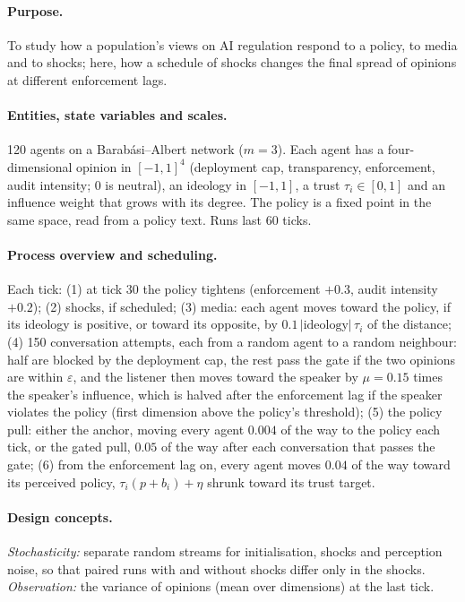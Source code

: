 \documentclass[11pt]{article}
\begin{document}
\paragraph{Purpose.} To study how a population's views on AI regulation respond to a policy, to media and to shocks; here, how a schedule of shocks changes the final spread of opinions at different enforcement lags.

\paragraph{Entities, state variables and scales.} 120 agents on a Barab\'asi--Albert network ($m=3$). Each agent has a four-dimensional opinion in $[-1,1]^4$ (deployment cap, transparency, enforcement, audit intensity; 0 is neutral), an ideology in $[-1,1]$, a trust $\tau_i \in [0,1]$ and an influence weight that grows with its degree. The policy is a fixed point in the same space, read from a policy text. Runs last 60 ticks.

\paragraph{Process overview and scheduling.} Each tick: (1) at tick 30 the policy tightens (enforcement $+0.3$, audit intensity $+0.2$); (2) shocks, if scheduled; (3) media: each agent moves toward the policy, if its ideology is positive, or toward its opposite, by $0.1\,|\text{ideology}|\,\tau_i$ of the distance; (4) 150 conversation attempts, each from a random agent to a random neighbour: half are blocked by the deployment cap, the rest pass the gate if the two opinions are within $\varepsilon$, and the listener then moves toward the speaker by $\mu = 0.15$ times the speaker's influence, which is halved after the enforcement lag if the speaker violates the policy (first dimension above the policy's threshold); (5) the policy pull: either the anchor, moving every agent $0.004$ of the way to the policy each tick, or the gated pull, $0.05$ of the way after each conversation that passes the gate; (6) from the enforcement lag on, every agent moves $0.04$ of the way toward its perceived policy, $\tau_i(p + b_i) + \eta$ shrunk toward its trust target.

\paragraph{Design concepts.} \emph{Stochasticity:} separate random streams for initialisation, shocks and perception noise, so that paired runs with and without shocks differ only in the shocks. \emph{Observation:} the variance of opinions (mean over dimensions) at the last tick.
\end{document}
